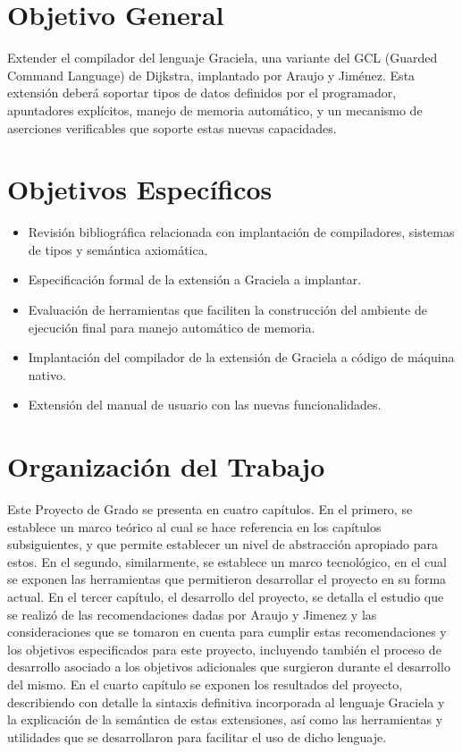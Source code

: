 \section*{Objetivo General}

Extender el compilador del lenguaje Graciela, una variante del GCL (Guarded
Command Language) de Dijkstra, implantado por Araujo y Jiménez. Esta extensión
deberá soportar tipos de datos definidos por el programador, apuntadores
explícitos, manejo de memoria automático, y un mecanismo de aserciones
verificables que soporte estas nuevas capacidades.

\section*{Objetivos Específicos}
\begin{itemize}
  \item Revisión bibliográfica relacionada con implantación de compiladores,
  sistemas de tipos y semántica axiomática.

  \item Especificación formal de la extensión a Graciela a implantar.

  \item Evaluación de herramientas que faciliten la construcción del ambiente de
  ejecución final para manejo automático de memoria.

  \item Implantación del compilador de la extensión de Graciela a código de
  máquina nativo.

  \item Extensión del manual de usuario con las nuevas funcionalidades.
\end{itemize}

\section*{Organización del Trabajo}

Este Proyecto de Grado se presenta en cuatro capítulos. En el primero, se
establece un marco teórico al cual se hace referencia en los capítulos
subsiguientes, y que permite establecer un nivel de abstracción apropiado para
estos. En el segundo, similarmente, se establece un marco tecnológico, en el
cual se exponen las herramientas que permitieron desarrollar el proyecto en su
forma actual. En el tercer capítulo, el desarrollo del proyecto, se detalla el
estudio que se realizó de las recomendaciones dadas por Araujo y Jimenez y las
consideraciones que se tomaron en cuenta para cumplir estas recomendaciones y
los objetivos especificados para este proyecto, incluyendo también el proceso de
desarrollo asociado a los objetivos adicionales que surgieron durante el
desarrollo del mismo. En el cuarto capítulo se exponen los resultados del
proyecto, describiendo con detalle la sintaxis definitiva incorporada al
lenguaje Graciela y la explicación de la semántica de estas extensiones, así
como las herramientas y utilidades que se desarrollaron para facilitar el uso de
dicho lenguaje.
